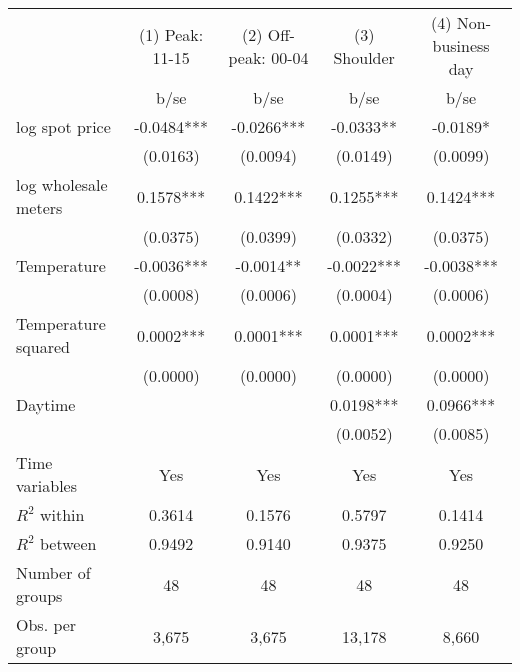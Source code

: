 \begin{tabular}{lcccc}\toprule
                    &(1) Peak: 11-15   &(2) Off-peak: 00-04   &(3) Shoulder   &(4) Non-business day   \\
                    &        b/se   &        b/se   &        b/se   &        b/se   \\
\midrule
log spot price      &     -0.0484***&     -0.0266***&     -0.0333** &     -0.0189*  \\
                    &    (0.0163)   &    (0.0094)   &    (0.0149)   &    (0.0099)   \\
log wholesale meters&      0.1578***&      0.1422***&      0.1255***&      0.1424***\\
                    &    (0.0375)   &    (0.0399)   &    (0.0332)   &    (0.0375)   \\
Temperature         &     -0.0036***&     -0.0014** &     -0.0022***&     -0.0038***\\
                    &    (0.0008)   &    (0.0006)   &    (0.0004)   &    (0.0006)   \\
Temperature squared &      0.0002***&      0.0001***&      0.0001***&      0.0002***\\
                    &    (0.0000)   &    (0.0000)   &    (0.0000)   &    (0.0000)   \\
Daytime             &               &               &      0.0198***&      0.0966***\\
                    &               &               &    (0.0052)   &    (0.0085)   \\
Time variables      &         Yes   &         Yes   &         Yes   &         Yes   \\
\midrule
\(R^2\) within      &      0.3614   &      0.1576   &      0.5797   &      0.1414   \\
\(R^2\) between     &      0.9492   &      0.9140   &      0.9375   &      0.9250   \\
Number of groups    &          48   &          48   &          48   &          48   \\
Obs. per group      &       3,675   &       3,675   &      13,178   &       8,660   \\
\bottomrule\end{tabular}
